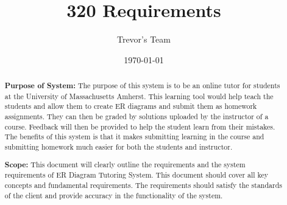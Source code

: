 \documentclass{article}
\title{320 Requirements}
\author{Trevor's Team}
\date{\today}
\begin{document}
\begin{titlepage}

\maketitle

\begin{abstract}
\textbf{Purpose of System:} \newline
\newline
The purpose of this system is to be an online tutor for students at the University of Massachusetts Amherst. This learning tool would help teach the students and allow them to create ER diagrams and submit them as homework assignments. They can then be graded by solutions uploaded by the instructor of a course. Feedback will then be provided to help the student learn from their mistakes. The benefits of this system is that it makes submitting learning in the course and submitting homework much easier for both the students and instructor. \newline


\textbf{Scope:}
\newline \newline
This document will clearly outline the requirements and the system requirements of ER Diagram Tutoring System. This document should cover all key concepts and fundamental requirements. The requirements should satisfy the standards of the client and provide accuracy in the functionality of the system. 


\end{abstract}

\end{titlepage}

\tableofcontents
\end{document}
